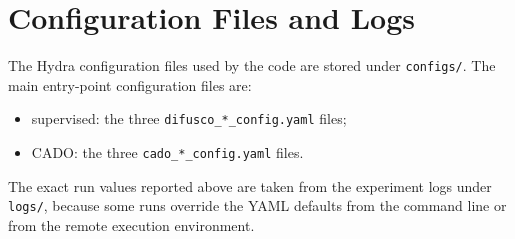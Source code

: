 \section{Configuration Files and Logs}
\label{app:config-files}

The Hydra configuration files used by the code are stored under \texttt{configs/}. The main
entry-point configuration files are:
\begin{itemize}
    \item supervised: the three \texttt{difusco\_*\_config.yaml} files;
    \item CADO: the three \texttt{cado\_*\_config.yaml} files.
\end{itemize}
The exact run values reported above are taken from the experiment logs under \texttt{logs/},
because some runs override the YAML defaults from the command line or from the remote execution
environment.
